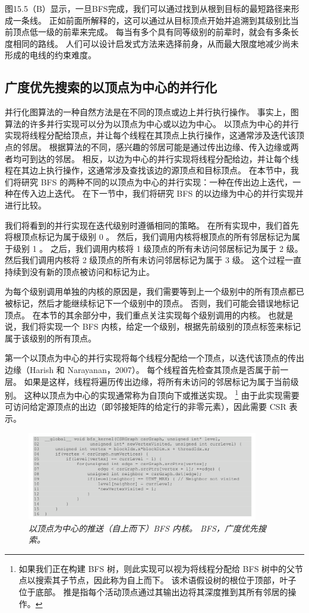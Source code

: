 图15.5（B）显示，一旦BFS完成，我们可以通过找到从根到目标的最短路径来形成一条线。 
正如前面所解释的，这可以通过从目标顶点开始并追溯到其级别比当前顶点低一级的前辈来完成。 
每当有多个具有同等级别的前辈时，就会有多条长度相同的路线。 
人们可以设计启发式方法来选择前身，从而最大限度地减少尚未形成的电线的约束难度。

\subsection{广度优先搜索的以顶点为中心的并行化}
并行化图算法的一种自然方法是在不同的顶点或边上并行执行操作。 事实上，图算法的许多并行实现可以分为以顶点为中心或以边为中心。 
以顶点为中心的并行实现将线程分配给顶点，并让每个线程在其顶点上执行操作，这通常涉及迭代该顶点的邻居。 
根据算法的不同，感兴趣的邻居可能是通过传出边缘、传入边缘或两者均可到达的邻居。 
相反，以边为中心的并行实现将线程分配给边，并让每个线程在其边上执行操作，这通常涉及查找该边的源顶点和目标顶点。 
在本节中，我们将研究 BFS 的两种不同的以顶点为中心的并行实现：一种在传出边上迭代，一种在传入边上迭代。 
在下一节中，我们将研究 BFS 的以边缘为中心的并行实现并进行比较。

我们将看到的并行实现在迭代级别时遵循相同的策略。 在所有实现中，我们首先将根顶点标记为属于级别 0 。 
然后，我们调用内核将根顶点的所有邻居标记为属于级别 1 。 之后，我们调用内核将 1 级顶点的所有未访问邻居标记为属于 2 级。 
然后我们调用内核将 2 级顶点的所有未访问邻居标记为属于 3 级。 这个过程一直持续到没有新的顶点被访问和标记为止。

为每个级别调用单独的内核的原因是，我们需要等到上一个级别中的所有顶点都已被标记，然后才能继续标记下一个级别中的顶点。 
否则，我们可能会错误地标记顶点。 在本节的其余部分中，我们重点关注实现每个级别调用的内核。 
也就是说，我们将实现一个 BFS 内核，给定一个级别，根据先前级别的顶点标签来标记属于该级别的所有顶点。

第一个以顶点为中心的并行实现将每个线程分配给一个顶点，以迭代该顶点的传出边缘（Harish 和 Narayanan，2007）。 
每个线程首先检查其顶点是否属于前一层。 如果是这样，线程将遍历传出边缘，将所有未访问的邻居标记为属于当前级别。 
这种以顶点为中心的实现通常称为自顶向下或推送实现。 
\footnote{如果我们正在构建 BFS 树，则此实现可以视为将线程分配给 BFS 树中的父节点以搜索其子节点，因此称为自上而下。 
该术语假设树的根位于顶部，叶子位于底部。 推是指每个活动顶点通过其输出边将其深度推到其所有邻居的操作。}
由于此实现需要可访问给定源顶点的出边（即邻接矩阵的给定行的非零元素），因此需要 CSR 表示。

\begin{figure}[H]
	\centering
	\includegraphics[width=0.9\textwidth]{figs/F15.6.png}
	\caption{\textit{以顶点为中心的推送（自上而下）BFS 内核。 BFS，广度优先搜索。}}
\end{figure}

